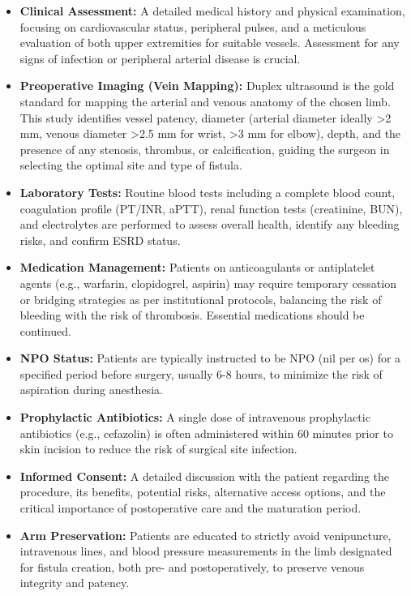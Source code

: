 \begin{itemize}
  \item \textbf{Clinical Assessment:} A detailed medical history and physical examination, focusing on cardiovascular status, peripheral pulses, and a meticulous evaluation of both upper extremities for suitable vessels. Assessment for any signs of infection or peripheral arterial disease is crucial.

  \item \textbf{Preoperative Imaging (Vein Mapping):} Duplex ultrasound is the gold standard for mapping the arterial and venous anatomy of the chosen limb. This study identifies vessel patency, diameter (arterial diameter ideally >2 mm, venous diameter >2.5 mm for wrist, >3 mm for elbow), depth, and the presence of any stenosis, thrombus, or calcification, guiding the surgeon in selecting the optimal site and type of fistula.

  \item \textbf{Laboratory Tests:} Routine blood tests including a complete blood count, coagulation profile (PT/INR, aPTT), renal function tests (creatinine, BUN), and electrolytes are performed to assess overall health, identify any bleeding risks, and confirm ESRD status.

  \item \textbf{Medication Management:} Patients on anticoagulants or antiplatelet agents (e.g., warfarin, clopidogrel, aspirin) may require temporary cessation or bridging strategies as per institutional protocols, balancing the risk of bleeding with the risk of thrombosis. Essential medications should be continued.

  \item \textbf{NPO Status:} Patients are typically instructed to be NPO (nil per os) for a specified period before surgery, usually 6-8 hours, to minimize the risk of aspiration during anesthesia.

  \item \textbf{Prophylactic Antibiotics:} A single dose of intravenous prophylactic antibiotics (e.g., cefazolin) is often administered within 60 minutes prior to skin incision to reduce the risk of surgical site infection.

  \item \textbf{Informed Consent:} A detailed discussion with the patient regarding the procedure, its benefits, potential risks, alternative access options, and the critical importance of postoperative care and the maturation period.

  \item \textbf{Arm Preservation:} Patients are educated to strictly avoid venipuncture, intravenous lines, and blood pressure measurements in the limb designated for fistula creation, both pre- and postoperatively, to preserve venous integrity and patency.
\end{itemize}

